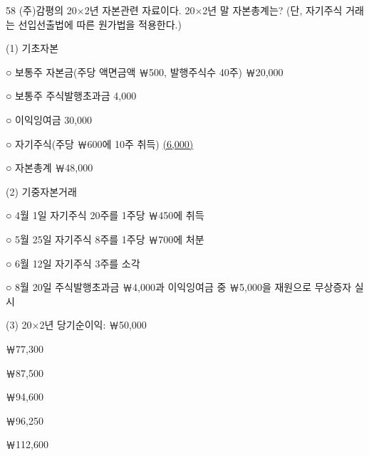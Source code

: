 \begin{question}{58}
(주)감평의 20×2년 자본관련 자료이다. 20×2년 말 자본총계는? (단, 자기주식 거래는 선입선출법에 따른 원가법을 적용한다.)
\begin{framedtext}
(1) 기초자본 \par
\hspace{1.5em}○ 보통주 자본금(주당 액면금액 ￦500, 발행주식수 40주) \hfill ￦20,000 \par
\hspace{1.5em}○ 보통주 주식발행초과금 \hfill 4,000 \par
\hspace{1.5em}○ 이익잉여금 \hfill 30,000 \par
\hspace{1.5em}○ 자기주식(주당 ￦600에 10주 취득) \hfill \uline{\hspace{1.5em}(6,000)} \par
\hspace{1.5em}○ 자본총계 \hfill ￦48,000 \par
(2) 기중자본거래 \par
\hspace{1.5em}○ 4월 1일 자기주식 20주를 1주당 ￦450에 취득 \par
\hspace{1.5em}○ 5월 25일 자기주식 8주를 1주당 ￦700에 처분 \par
\hspace{1.5em}○ 6월 12일 자기주식 3주를 소각 \par
\hspace{1.5em}○ 8월 20일 주식발행초과금 ￦4,000과 이익잉여금 중 ￦5,000을 재원으로 무상증자 실시 \par
(3) 20×2년 당기순이익: ￦50,000 \par
\end{framedtext}
\begin{choices}
  \item ￦77,300
  \item ￦87,500
  \item ￦94,600
  \item ￦96,250
  \item ￦112,600
\end{choices}
\end{question}
